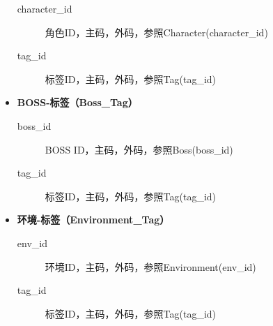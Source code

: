 \documentclass{ctexart}
\begin{document}
\begin{itemize}
    \begin{description}
      \item[character\_id] 角色ID，主码，外码，参照Character(character\_id)
      \item[tag\_id] 标签ID，主码，外码，参照Tag(tag\_id)
    \end{description}
  \item \textbf{BOSS-标签（Boss\_Tag）}
    \begin{description}
      \item[boss\_id] BOSS ID，主码，外码，参照Boss(boss\_id)
      \item[tag\_id] 标签ID，主码，外码，参照Tag(tag\_id)
    \end{description}
  \item \textbf{环境-标签（Environment\_Tag）}
    \begin{description}
      \item[env\_id] 环境ID，主码，外码，参照Environment(env\_id)
      \item[tag\_id] 标签ID，主码，外码，参照Tag(tag\_id)
    \end{description}
\end{itemize}
\end{document}
